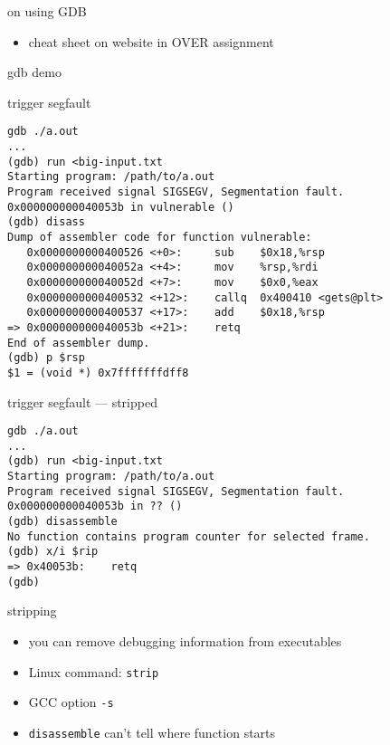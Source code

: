 
\begin{frame}{on using GDB}
    \begin{itemize}
    \item cheat sheet on website in OVER assignment
    \end{itemize}
\end{frame}

\begin{frame}{gdb demo}
\end{frame}

\begin{frame}[fragile,label=trigSeg]{trigger segfault}
\begin{Verbatim}[fontsize=\fontsize{10}{11}\selectfont]
gdb ./a.out
...
(gdb) run <big-input.txt
Starting program: /path/to/a.out 
Program received signal SIGSEGV, Segmentation fault.
0x000000000040053b in vulnerable ()
(gdb) disass
Dump of assembler code for function vulnerable:
   0x0000000000400526 <+0>:     sub    $0x18,%rsp
   0x000000000040052a <+4>:     mov    %rsp,%rdi
   0x000000000040052d <+7>:     mov    $0x0,%eax
   0x0000000000400532 <+12>:    callq  0x400410 <gets@plt>
   0x0000000000400537 <+17>:    add    $0x18,%rsp
=> 0x000000000040053b <+21>:    retq   
End of assembler dump.
(gdb) p $rsp 
$1 = (void *) 0x7fffffffdff8
\end{Verbatim}
\end{frame}

\begin{frame}[fragile,label=trigSegStripped]{trigger segfault --- stripped}
\begin{Verbatim}[fontsize=\fontsize{10}{11}\selectfont]
gdb ./a.out
...
(gdb) run <big-input.txt
Starting program: /path/to/a.out 
Program received signal SIGSEGV, Segmentation fault.
0x000000000040053b in ?? ()
(gdb) disassemble
No function contains program counter for selected frame.
(gdb) x/i $rip
=> 0x40053b:    retq   
(gdb)
\end{Verbatim}
\end{frame}

\begin{frame}{stripping}
\begin{itemize}
\item you can remove debugging information from executables
\item Linux command: \texttt{strip}
\item GCC option \texttt{-s}
\item \texttt{disassemble} can't tell where function starts
\end{itemize}
\end{frame}

